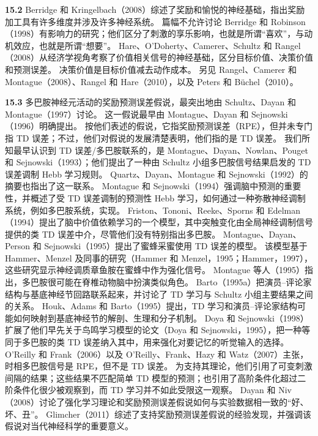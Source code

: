 \documentclass[UTF8,12pt,a4paper,fontset=fandol]{ctexart}
\begin{document}
\noindent\textbf{15.2}
Berridge 和 Kringelbach（2008）综述了奖励和愉悦的神经基础，指出奖励加工具有许多维度并涉及许多神经系统。
篇幅不允许讨论 Berridge 和 Robinson（1998）有影响力的研究；他们区分了刺激的享乐影响，也就是所谓“喜欢”，与动机效应，也就是所谓“想要”。
Hare、O'Doherty、Camerer、Schultz 和 Rangel（2008）从经济学视角考察了价值相关信号的神经基础，区分目标价值、决策价值和预测误差。
决策价值是目标价值减去动作成本。
另见 Rangel、Camerer 和 Montague（2008）、Rangel 和 Hare（2010），以及 Peters 和 Büchel（2010）。

\noindent\textbf{15.3}
多巴胺神经元活动的奖励预测误差假说，最突出地由 Schultz、Dayan 和 Montague（1997）讨论。
这一假说最早由 Montague、Dayan 和 Sejnowski（1996）明确提出。
按他们表述的假说，它指奖励预测误差（RPE），但并未专门指 TD 误差；不过，他们对假说的发展清楚表明，他们指的是 TD 误差。
我们所知最早认识到 TD 误差/多巴胺联系的，是 Montague、Dayan、Nowlan、Pouget 和 Sejnowski（1993）；他们提出了一种由 Schultz 小组多巴胺信号结果启发的 TD 误差调制 Hebb 学习规则。
Quartz、Dayan、Montague 和 Sejnowski（1992）的摘要也指出了这一联系。
Montague 和 Sejnowski（1994）强调脑中预测的重要性，并概述了受 TD 误差调制的预测性 Hebb 学习，如何通过一种弥散神经调制系统，例如多巴胺系统，实现。
Friston、Tononi、Reeke、Sporns 和 Edelman（1994）提出了脑中价值依赖学习的一个模型，其中突触变化由全局神经调制信号提供的类 TD 误差中介，尽管他们没有特别指出多巴胺。
Montague、Dayan、Person 和 Sejnowski（1995）提出了蜜蜂采蜜使用 TD 误差的模型。
该模型基于 Hammer、Menzel 及同事的研究（Hammer 和 Menzel，1995；Hammer，1997），这些研究显示神经调质章鱼胺在蜜蜂中作为强化信号。
Montague 等人（1995）指出，多巴胺很可能在脊椎动物脑中扮演类似角色。
Barto（1995a）把演员--评论家结构与基底神经节回路联系起来，并讨论了 TD 学习与 Schultz 小组主要结果之间的关系。
Houk、Adams 和 Barto（1995）提出，TD 学习和演员--评论家结构可能如何映射到基底神经节的解剖、生理和分子机制。
Doya 和 Sejnowski（1998）扩展了他们早先关于鸟鸣学习模型的论文（Doya 和 Sejnowski，1995），把一种等同于多巴胺的类 TD 误差纳入其中，用来强化对要记忆的听觉输入的选择。
O'Reilly 和 Frank（2006）以及 O'Reilly、Frank、Hazy 和 Watz（2007）主张，时相多巴胺信号是 RPE，但不是 TD 误差。
为支持其理论，他们引用了可变刺激间隔的结果；这些结果不匹配简单 TD 模型的预测；也引用了高阶条件化超过二阶条件化很少被观察到，而 TD 学习并不如此受限这一观察。
Dayan 和 Niv（2008）讨论了强化学习理论和奖励预测误差假说如何与实验数据相一致的“好、坏、丑”。
Glimcher（2011）综述了支持奖励预测误差假说的经验发现，并强调该假说对当代神经科学的重要意义。
\end{document}
